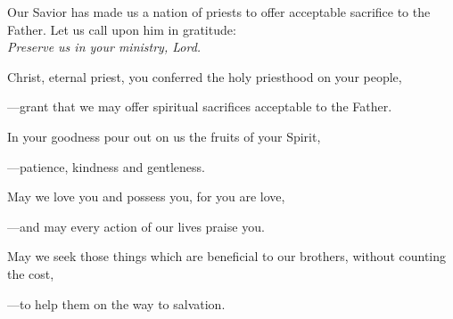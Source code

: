 \intercessions\indent

\begin{hangpar}

Our Savior has made us a nation of priests to offer acceptable sacrifice to the Father. Let us call upon him in gratitude:\\
\emph{Preserve us in your ministry, Lord.}

\medskip Christ, eternal priest, you conferred the holy priesthood on your people,

{\color{red}---\thinspace}grant that we may offer spiritual sacrifices acceptable to the Father.

\medskip In your goodness pour out on us the fruits of your Spirit,

{\color{red}---\thinspace}patience, kindness and gentleness.

\medskip May we love you and possess you, for you are love,

{\color{red}---\thinspace}and may every action of our lives praise you.

\medskip May we seek those things which are beneficial to our brothers, without counting the cost,

{\color{red}---\thinspace}to help them on the way to salvation.

\end{hangpar}

